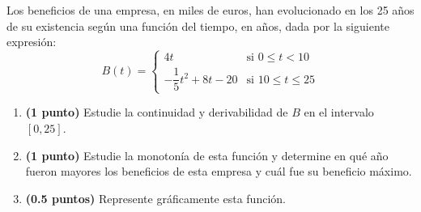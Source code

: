 
Los beneficios de una empresa, en miles de euros, han evolucionado en los 25 años de su existencia según una función del tiempo, en años, dada por la siguiente expresión:
\[
B(t)=\begin{cases}
4t & \text{si }0\leq t<10\\[4pt]
-\dfrac{1}{5}t^2+8t-20 & \text{si }10\leq t\leq 25
\end{cases}
\]
\begin{enumerate}[label=\alph*)]
\item \textbf{(1 punto)} Estudie la continuidad y derivabilidad de $B$ en el intervalo $[0,25]$.
\item \textbf{(1 punto)} Estudie la monotonía de esta función y determine en qué año fueron mayores los beneficios de esta empresa y cuál fue su beneficio máximo.
\item \textbf{(0.5 puntos)} Represente gráficamente esta función.
\end{enumerate}
